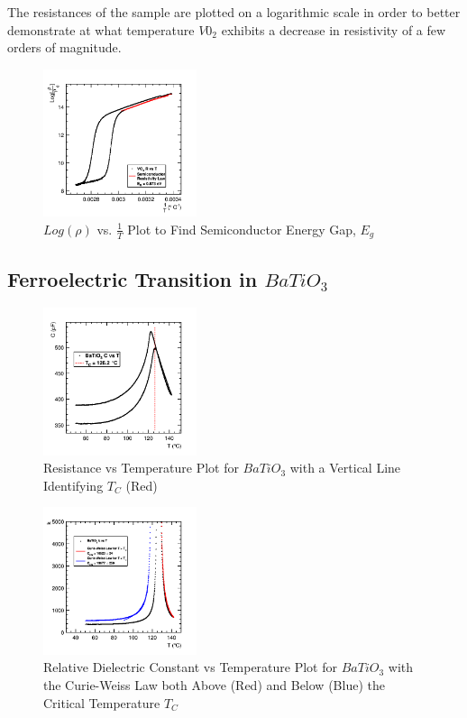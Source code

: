 \documentclass[%
 reprint,
 amsmath,amssymb,
 aps,
 pra,
]{revtex4-1}
\begin{document}
The resistances of the sample are plotted on a logarithmic scale in order to better demonstrate at what temperature $V0_{2}$ exhibits a decrease in resistivity of a few orders of magnitude. 

\begin{figure}[H]
	\centering
	\includegraphics[width=0.4\textwidth]{VO2_LogRvTInv.png}
	\caption{$Log(\rho)$ vs. $\frac{1}{T}$ Plot to Find Semiconductor Energy Gap, $E_{g}$}
	\label{Fig:RvT2}
\end{figure}

\subsection{Ferroelectric Transition in $BaTiO_{3}$}

\begin{figure}[H]
	\centering
	\includegraphics[width=0.4\textwidth]{BaTiO3_CvT_withTC.png}
	\caption{Resistance vs Temperature Plot for $BaTiO_{3}$ with a Vertical Line Identifying $T_{C}$ (Red)}
	\label{Fig:CvT1}
\end{figure}

\begin{figure}[H]
	\centering
	\includegraphics[width=0.4\textwidth]{BaTiO3_kvT.png}
	\caption{Relative Dielectric Constant vs Temperature Plot for $BaTiO_{3}$ with the Curie-Weiss Law both Above (Red) and Below (Blue) the Critical Temperature $T_{C}$}
	\label{Fig:kvT}
\end{figure}
\end{document}
